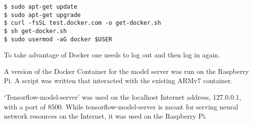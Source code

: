 \begin{verbatim}
$ sudo apt-get update
$ sudo apt-get upgrade
$ curl -fsSL test.docker.com -o get-docker.sh 
$ sh get-docker.sh
$ sudo usermod -aG docker $USER
\end{verbatim}

To take advantage of Docker one needs to log out and then log in again.

A version of the Docker Container for the model server was run on the Raspberry Pi. A script was written that interacted with the existing ARMv7 container. %

`Tensorflow-model-server' was used on the localhost Internet address, 127.0.0.1, with a port of 8500. While tensorflow-model-server is meant for serving neural network resources on the Internet, it was used on the Raspberry Pi.

